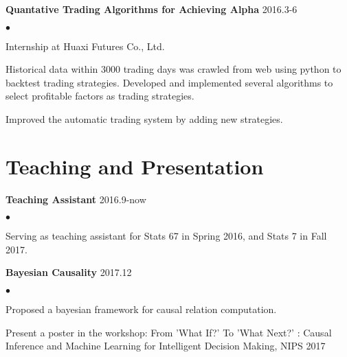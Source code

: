 \documentclass[margin,line]{res}
\newenvironment{list2}{
  \begin{list}{$\bullet$}{%
      \setlength{\itemsep}{0in}
      \setlength{\parsep}{0in} \setlength{\parskip}{0in}
      \setlength{\topsep}{0in} \setlength{\partopsep}{0in}
      \setlength{\leftmargin}{0.2in}}}{\end{list}}
\begin{document}
\begin{resume}
{\bf Quantative Trading Algorithms for Achieving Alpha}       \hfill{2016.3-6}
\begin{list2}
\item Internship at Huaxi Futures Co., Ltd. 
\item Historical data within 3000 trading days was crawled from web using python to backtest trading strategies. Developed and implemented several algorithms to select profitable factors as trading strategies. 
\item Improved the automatic trading system by adding new strategies.
\end{list2}

\section{\sc Teaching and Presentation}
{\bf Teaching Assistant}       \hfill{2016.9-now}
\begin{list2}
\item Serving as teaching assistant for Stats 67 in Spring 2016, and Stats 7 in Fall 2017.
\end{list2}


{\bf Bayesian Causality} \hfill{2017.12}
\begin{list2}
\item Proposed a bayesian framework for causal relation computation. 
\item Present a poster in the workshop: From 'What If?' To 'What Next?' : Causal Inference and Machine Learning for Intelligent Decision Making, NIPS 2017
\end{list2}




\end{resume}
\end{document}
